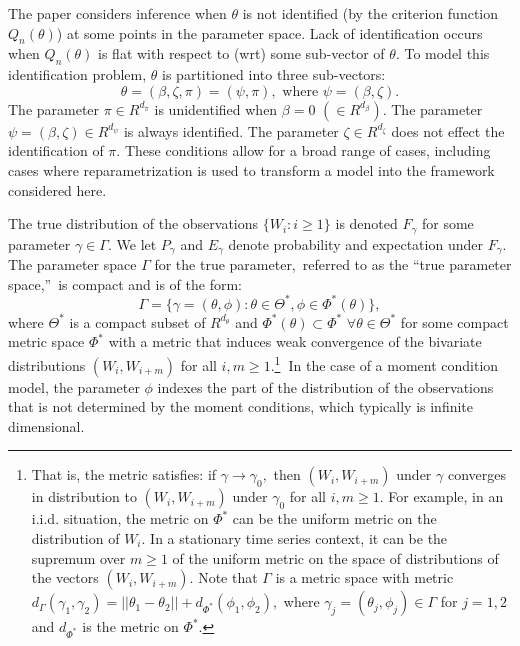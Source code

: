 \documentclass[12pt,thmsb,titlepage,final,oneside,letterpaper]{article}
\begin{document}
The paper considers inference when $\theta $ is not identified (by the
criterion function $Q_{n}(\theta )$) at some points in the parameter space.
Lack of identification occurs when $Q_{n}(\theta )$ is flat with respect to
(wrt) some sub-vector of $\theta .$ To model this identification problem, $%
\theta $ is partitioned into three sub-vectors:%
\begin{equation}
\theta =(\beta ,\zeta ,\pi )=(\psi ,\pi ),\text{ where }\psi =(\beta ,\zeta
).
\end{equation}%
The parameter $\pi \in R^{d_{\pi }}$ is unidentified when $\beta =0$ $(\in
R^{d_{\beta }}).$ The parameter $\psi =(\beta ,\zeta )\in R^{d_{\psi }}$ is
always identified. The parameter $\zeta \in R^{d_{\zeta }}$ does not effect
the identification of $\pi .$ These conditions allow for a broad range of
cases, including cases where reparametrization is used to transform a model
into the framework considered here.

The true distribution of the observations $\{W_{i}:i\geq 1\}$ is denoted $%
F_{\gamma }$ for some parameter $\gamma \in \Gamma .$ We let $P_{\gamma }$
and $E_{\gamma }$ denote probability and expectation under $F_{\gamma }.$
The parameter space $\Gamma $ for the true parameter,\ referred to as the
\textquotedblleft true parameter space,\textquotedblright\ is compact and is
of the form:%
\begin{equation}
\Gamma =\{\gamma =(\theta ,\phi ):\theta \in \Theta ^{\ast },\phi \in \Phi
^{\ast }(\theta )\},  \label{True Par Space Gamma}
\end{equation}%
where $\Theta ^{\ast }$ is a compact subset of $R^{d_{\theta }}$ and $\Phi
^{\ast }(\theta )\subset \Phi ^{\ast }$ $\forall \theta \in \Theta ^{\ast }$
for some compact metric space $\Phi ^{\ast }$ with a metric that induces
weak convergence of the bivariate distributions $(W_{i},W_{i+m})$ for all $%
i,m\geq 1.$\footnote{%
That is, the metric satisfies: if $\gamma \rightarrow \gamma _{0},$ then $%
(W_{i},W_{i+m})$ under $\gamma $ converges in distribution to $%
(W_{i},W_{i+m})$ under $\gamma _{0}$ for all $i,m\geq 1.$ For example, in an
i.i.d. situation, the metric on $\Phi ^{\ast }$ can be the uniform metric on
the distribution of $W_{i}.$ In a stationary time series context, it can be
the supremum over $m\geq 1$ of the uniform metric on the space of
distributions of the vectors $(W_{i},W_{i+m}).$ Note that $\Gamma $ is a
metric space with metric $d_{\Gamma }(\gamma _{1},\gamma _{2})=||\theta
_{1}-\theta _{2}||+d_{\Phi ^{\ast }}(\phi _{1},\phi _{2}),$ where $\gamma
_{j}=(\theta _{j},\phi _{j})\in \Gamma $ for $j=1,2$ and $d_{\Phi ^{\ast }}$
is the metric on $\Phi ^{\ast }.$}\textbf{\ }In the case of a moment
condition model, the parameter $\phi $ indexes the part of the distribution
of the observations that is not determined by the moment conditions, which
typically is infinite dimensional.
\end{document}
